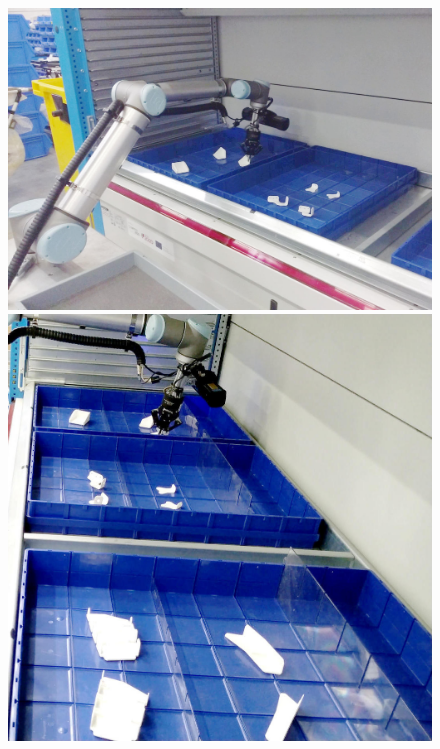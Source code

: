 \begin{figure}[h!]
{\begin{tcolorbox}
	\includegraphics[height=.15\textheight]{Cap5/Figuras/picking_embraer/back-2}
	\includegraphics[height=.15\textheight]{Cap5/Figuras/picking_embraer/side-2}\\

\end{tcolorbox}}
\end{figure}
